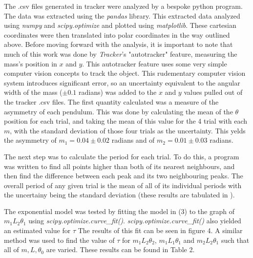 \documentclass[11pt]{article}
\begin{document}
\begin{multicols}{2}

    The .csv files generated in tracker were analyzed by a bespoke python program. The data was extracted using the \textit{pandas} library. This extracted data analyzed using \textit{numpy} and \textit{scipy.optimize} and plotted using \textit{matplotlib}. These cartesian coordinates were then translated into polar coordinates in the way outlined above. Before moving forward with the analysis, it is important to note that much of this work was done by \textit{Tracker}'s "autotracker" feature, measuring the mass's position in $x$ and $y$. This autotracker feature uses some very simple computer vision concepts to track the object. This rudementary computer vision system introduces significant error, so an uncertainty equivalent to the angular width of the mass ($\pm 0.1$ radians) was added to the $x$ and $y$ values pulled out of the tracker .csv files. The first quantity calculated was a measure of the asymmetry of each pendulum. This was done by calculating the mean of the $\theta$ position for each trial, and taking the mean of this value for the 4 trial with each $m$, with the standard deviation of those four trials as the uncertainty. This yelds the asymmetry of $m_1 = 0.04 \pm 0.02$ radians and of $m_2 = 0.01 \pm 0.03$ radians. 

    The next step was to calculate the period for each trial. To do this, a program was written to find all points higher than both of its nearest neighbours, and then find the difference between each peak and its two neighbouring peaks. The overall period of any given trial is the mean of all of its individual periods with the uncertainy being the standard deviation (these results are tabulated in \label{periodTable}). 

    The exponential model was tested by fitting the model in (3) to the graph of $m_1 L_2 \theta_1$ using \textit{scipy.optimize.curve\_fit()}. \textit{scipy.optimize.curve\_fit()} also yielded an estimated value for $\tau$ The results of this fit can be seen in figure 4. A similar method was used to find the value of $\tau$ for $m_1 L_2 \theta_2$, $m_1 L_1 \theta_1$ and $m_2 L_2 \theta_1$ such that all of $m, L, \theta_0$ are varied. These results can be found in Table 2.


\end{multicols}
\end{document}

